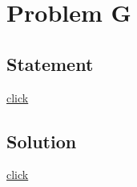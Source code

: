 \section{Problem G}
    \subsection{Statement}
        {\color{blue} \href{http://foobar.iiitd.edu.in/contest/team/problem.php?id=607}{click}}

    \subsection{Solution}
        {\color{blue} \href{http://codeforces.com/group/qo1icaI3vI/blog/entry/843#B}{click}}
